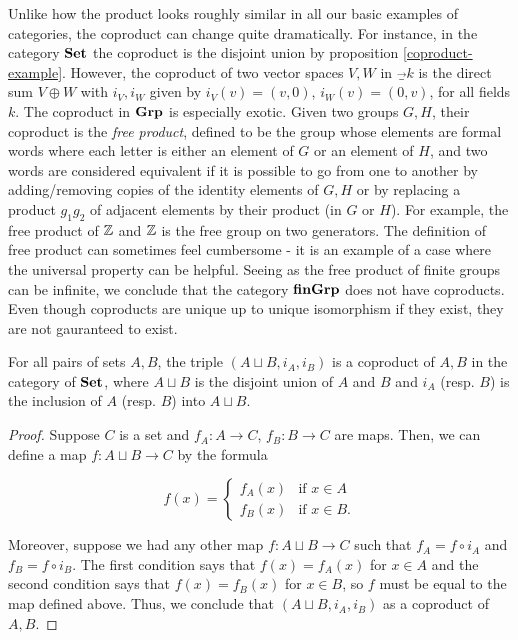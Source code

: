 \begin{rem}\label{coproduct-examples-remark} Unlike how the product looks roughly similar in all our basic examples of categories, the coproduct can change quite dramatically. For instance, in the category ${\bf Set}$ the coproduct is the disjoint union by proposition \ref{coproduct-example}. However, the coproduct of two vector spaces $V,W$ in $\Vec_k$ is the direct sum $V\oplus W$ with $i_V,i_W$ given by $i_V(v)=(v,0)$, $i_W(v)=(0,v)$, for all fields $k$. The coproduct in ${\bf Grp}$ is especially exotic. Given two groups $G,H$, their coproduct is the {\em free product}, defined to be the group whose elements are formal words where each letter is either an element of $G$ or an element of $H$, and two words are considered equivalent if it is possible to go from one to another by adding/removing copies of the identity elements of $G,H$ or by replacing a product $g_1g_2$ of adjacent elements by their product (in $G$ or $H$). For example, the free product of ${\mathbb Z}$ and ${\mathbb Z}$ is the free group on two generators. The definition of free product can sometimes feel cumbersome - it is an example of a case where the universal property can be helpful. Seeing as the free product of finite groups can be infinite, we conclude that the category ${\bf finGrp}$ does not have coproducts. Even though coproducts are unique up to unique isomorphism if they exist, they are not gauranteed to exist.

\end{rem}

\begin{prop}\label{coproduct-example} For all pairs of sets $A,B$, the triple $(A\sqcup B,i_A,i_B)$ is a coproduct of $A,B$ in the category of ${\bf Set}$, where $A\sqcup B$ is the disjoint union of $A$ and $B$ and $i_A$ (resp. $B$) is the inclusion of $A$ (resp. $B$) into $A\sqcup B$.
\end{prop}
\begin{proof} Suppose $C$ is a set and $f_A:A\to C$, $f_B:B\to C$ are maps. Then, we can define a map $f:A\sqcup B\to C$ by the formula

$$
f(x)=
\begin{cases}
f_A(x) & \text{if } x\in A\\
f_B(x) & \text{if } x\in B.
\end{cases}
$$

Moreover, suppose we had any other map $f:A\sqcup B\to C$ such that $f_A=f\circ i_A$ and $f_B=f\circ i_B$. The first condition says that $f(x)=f_A(x)$ for $x\in A$ and the second condition says that $f(x)=f_B(x)$ for $x\in B$, so $f$ must be equal to the map defined above. Thus, we conclude that $(A\sqcup B,i_A,i_B)$ as a coproduct of $A,B$.
\end{proof}

